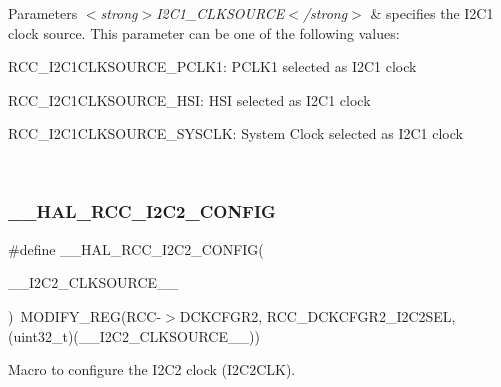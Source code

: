 \begin{DoxyParams}{Parameters}
{\em $<$strong$>$\+I2\+C1\+\_\+\+C\+L\+K\+S\+O\+U\+R\+C\+E$<$/strong$>$} & specifies the I2\+C1 clock source. This parameter can be one of the following values\+: \begin{DoxyItemize}
\item R\+C\+C\+\_\+\+I2\+C1\+C\+L\+K\+S\+O\+U\+R\+C\+E\+\_\+\+P\+C\+L\+K1\+: P\+C\+L\+K1 selected as I2\+C1 clock \item R\+C\+C\+\_\+\+I2\+C1\+C\+L\+K\+S\+O\+U\+R\+C\+E\+\_\+\+H\+SI\+: H\+SI selected as I2\+C1 clock \item R\+C\+C\+\_\+\+I2\+C1\+C\+L\+K\+S\+O\+U\+R\+C\+E\+\_\+\+S\+Y\+S\+C\+LK\+: System Clock selected as I2\+C1 clock \end{DoxyItemize}
\\
\hline
\end{DoxyParams}
\mbox{\label{group___r_c_c_ex___exported___macros_ga49280a374f55802d8063a083350572ab}} 
\subsubsection{\texorpdfstring{\_\_HAL\_RCC\_I2C2\_CONFIG}{\_\_HAL\_RCC\_I2C2\_CONFIG}}
{\footnotesize\ttfamily \#define \+\_\+\+\_\+\+H\+A\+L\+\_\+\+R\+C\+C\+\_\+\+I2\+C2\+\_\+\+C\+O\+N\+F\+IG(\begin{DoxyParamCaption}\item[{}]{\+\_\+\+\_\+\+I2\+C2\+\_\+\+C\+L\+K\+S\+O\+U\+R\+C\+E\+\_\+\+\_\+ }\end{DoxyParamCaption})~M\+O\+D\+I\+F\+Y\+\_\+\+R\+EG(R\+CC-\/$>$D\+C\+K\+C\+F\+G\+R2, R\+C\+C\+\_\+\+D\+C\+K\+C\+F\+G\+R2\+\_\+\+I2\+C2\+S\+EL, (uint32\+\_\+t)(\+\_\+\+\_\+\+I2\+C2\+\_\+\+C\+L\+K\+S\+O\+U\+R\+C\+E\+\_\+\+\_\+))}



Macro to configure the I2\+C2 clock (I2\+C2\+C\+LK). 


